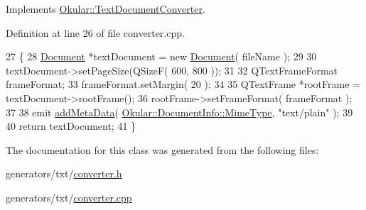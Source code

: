 Implements \hyperlink{classOkular_1_1TextDocumentConverter_ad05f8bcde0f347c6292968fab331bcef}{Okular\+::\+Text\+Document\+Converter}.



Definition at line 26 of file converter.\+cpp.


\begin{DoxyCode}
27 \{
28     \hyperlink{classTxt_1_1Document}{Document} *textDocument = \textcolor{keyword}{new} \hyperlink{classTxt_1_1Document}{Document}( fileName );
29 
30     textDocument->setPageSize(QSizeF( 600, 800 ));
31 
32     QTextFrameFormat frameFormat;
33     frameFormat.setMargin( 20 );
34 
35     QTextFrame *rootFrame = textDocument->rootFrame();
36     rootFrame->setFrameFormat( frameFormat );
37 
38     emit \hyperlink{classOkular_1_1TextDocumentConverter_ad6e263857527273c9cf618e16329f6a7}{addMetaData}( \hyperlink{classOkular_1_1DocumentInfo_a3a6e5f7fb246e29bcb2e830b6f770791a786464e8e8c3e6ba1cd74e408487785b}{Okular::DocumentInfo::MimeType}, \textcolor{stringliteral}{"text/plain"}
       );
39 
40     \textcolor{keywordflow}{return} textDocument;
41 \}
\end{DoxyCode}


The documentation for this class was generated from the following files\+:\begin{DoxyCompactItemize}
\item 
generators/txt/\hyperlink{txt_2converter_8h}{converter.\+h}\item 
generators/txt/\hyperlink{txt_2converter_8cpp}{converter.\+cpp}\end{DoxyCompactItemize}
